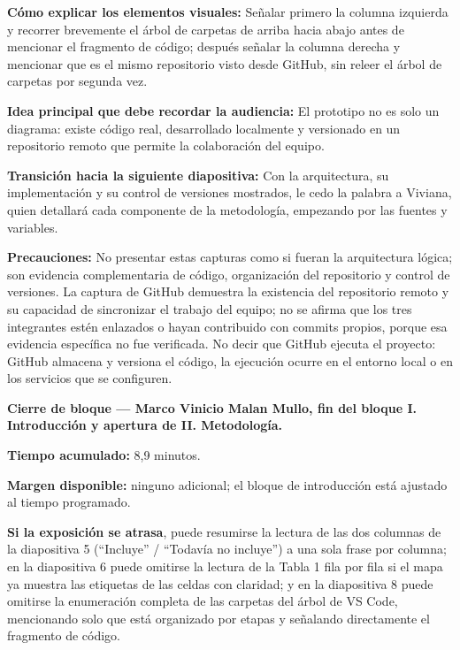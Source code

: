 \documentclass[11pt,a4paper]{article}
\newcommand{\campo}[2]{\par\medskip\noindent\textbf{#1:} #2\par}
\newenvironment{cierrebloque}[1]{%
  \begin{framed}\small\noindent\textbf{Cierre de bloque --- #1.}\par\smallskip
}{%
  \end{framed}\bigskip
}
\newcommand{\separadordiapositiva}{\bigskip\noindent{\color{Tierra!60}\hrulefill}\bigskip}
\begin{document}
\campo{C\'omo explicar los elementos visuales}{Se\~nalar primero la
columna izquierda y recorrer brevemente el \'arbol de carpetas de
arriba hacia abajo antes de mencionar el fragmento de c\'odigo;
despu\'es se\~nalar la columna derecha y mencionar que es el mismo
repositorio visto desde GitHub, sin releer el \'arbol de carpetas por
segunda vez.}
\campo{Idea principal que debe recordar la audiencia}{El prototipo no
es solo un diagrama: existe c\'odigo real, desarrollado localmente y
versionado en un repositorio remoto que permite la colaboraci\'on del
equipo.}
\campo{Transici\'on hacia la siguiente diapositiva}{Con la
arquitectura, su implementaci\'on y su control de versiones mostrados,
le cedo la palabra a Viviana, quien detallar\'a cada componente de la
metodolog\'ia, empezando por las fuentes y variables.}
\campo{Precauciones}{No presentar estas capturas como si fueran la
arquitectura l\'ogica; son evidencia complementaria de c\'odigo,
organizaci\'on del repositorio y control de versiones. La captura de
GitHub demuestra la existencia del repositorio remoto y su capacidad
de sincronizar el trabajo del equipo; no se afirma que los tres
integrantes est\'en enlazados o hayan contribuido con commits propios,
porque esa evidencia espec\'ifica no fue verificada. No decir que
GitHub ejecuta el proyecto: GitHub almacena y versiona el c\'odigo, la
ejecuci\'on ocurre en el entorno local o en los servicios que se
configuren.}

\separadordiapositiva

\begin{cierrebloque}{Marco Vinicio Malan Mullo, fin del bloque I. Introducci\'on y apertura de II. Metodolog\'ia}
\textbf{Tiempo acumulado:} 8,9 minutos.

\textbf{Margen disponible:} ninguno adicional; el bloque de
introducci\'on est\'a ajustado al tiempo programado.

\textbf{Si la exposici\'on se atrasa}, puede resumirse la lectura de las
dos columnas de la diapositiva 5 (``Incluye'' / ``Todav\'ia no
incluye'') a una sola frase por columna; en la diapositiva 6 puede
omitirse la lectura de la Tabla 1 fila por fila si el mapa ya muestra
las etiquetas de las celdas con claridad; y en la diapositiva 8 puede
omitirse la enumeraci\'on completa de las carpetas del \'arbol de
VS Code, mencionando solo que est\'a organizado por etapas y se\~nalando
directamente el fragmento de c\'odigo.
\end{cierrebloque}

\end{document}
